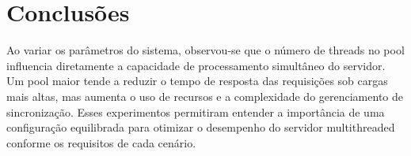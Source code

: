 \documentclass{article}
\begin{document}
\section*{Conclusões}
Ao variar os parâmetros do sistema, observou-se que o número de threads no pool influencia diretamente
a capacidade de processamento simultâneo do servidor. Um pool maior tende a reduzir o tempo de resposta
das requisições sob cargas mais altas, mas aumenta o uso de recursos e a complexidade do gerenciamento
de sincronização. Esses experimentos permitiram entender a importância de uma configuração equilibrada
para otimizar o desempenho do servidor multithreaded conforme os requisitos de cada cenário.
\end{document}
